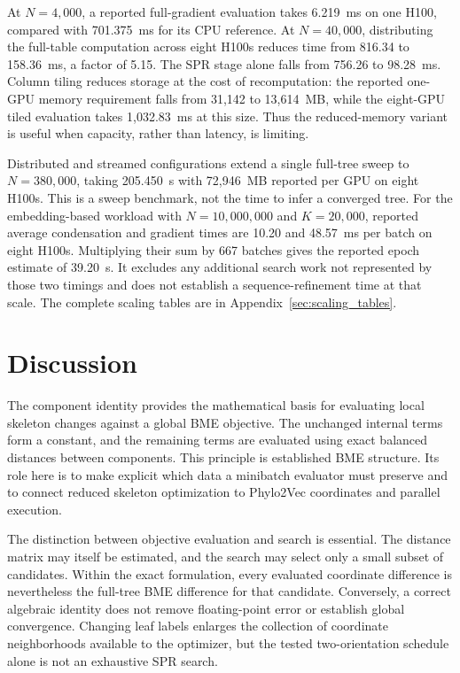 \documentclass[11pt,a4paper]{article}
\makeatletter
\DeclareRobustCommand{\_}{\ifmmode\nfss@text{\textunderscore}\else\textunderscore\allowbreak\fi}
\theoremstyle{definition}
\makeatother
\begin{document}
At $N=4{,}000$, a reported full-gradient evaluation takes 6.219~ms on one H100, compared with 701.375~ms for its CPU reference.
At $N=40{,}000$, distributing the full-table computation across eight H100s reduces time from 816.34 to 158.36~ms, a factor of 5.15.
The SPR stage alone falls from 756.26 to 98.28~ms.
Column tiling reduces storage at the cost of recomputation: the reported one-GPU memory requirement falls from 31,142 to 13,614~MB, while the eight-GPU tiled evaluation takes 1,032.83~ms at this size.
Thus the reduced-memory variant is useful when capacity, rather than latency, is limiting.

Distributed and streamed configurations extend a single full-tree sweep to $N=380{,}000$, taking 205.450~s with 72,946~MB reported per GPU on eight H100s.
This is a sweep benchmark, not the time to infer a converged tree.
For the embedding-based workload with $N=10{,}000{,}000$ and $K=20{,}000$, reported average condensation and gradient times are 10.20 and 48.57~ms per batch on eight H100s.
Multiplying their sum by 667 batches gives the reported epoch estimate of 39.20~s.
It excludes any additional search work not represented by those two timings and does not establish a sequence-refinement time at that scale.
The complete scaling tables are in Appendix~\ref{sec:scaling_tables}.

\section{Discussion}

The component identity provides the mathematical basis for evaluating local skeleton changes against a global BME objective.
The unchanged internal terms form a constant, and the remaining terms are evaluated using exact balanced distances between components.
This principle is established BME structure.
Its role here is to make explicit which data a minibatch evaluator must preserve and to connect reduced skeleton optimization to Phylo2Vec coordinates and parallel execution.

The distinction between objective evaluation and search is essential.
The distance matrix may itself be estimated, and the search may select only a small subset of candidates.
Within the exact formulation, every evaluated coordinate difference is nevertheless the full-tree BME difference for that candidate.
Conversely, a correct algebraic identity does not remove floating-point error or establish global convergence.
Changing leaf labels enlarges the collection of coordinate neighborhoods available to the optimizer, but the tested two-orientation schedule alone is not an exhaustive SPR search.
\end{document}
